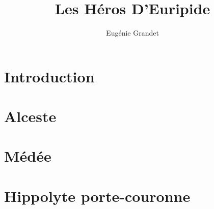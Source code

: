 \documentclass[a4paper,12pt,twoside]{book}
\begin{document}
\title{Les Héros D'Euripide}
\author{Eugénie Grandet}
\maketitle

\tableofcontents

\chapter{Introduction}

\chapter{Alceste}
\lipsum[1-4]
\lipsum[5-8]
\lipsum[9-12]

\chapter{Médée}
\lipsum[13-16]
\lipsum[17-20]
\lipsum[21-24]

\chapter{Hippolyte porte-couronne}
\lipsum[25-28]
\lipsum[29-32]
\lipsum[33-36]
\end{document}
